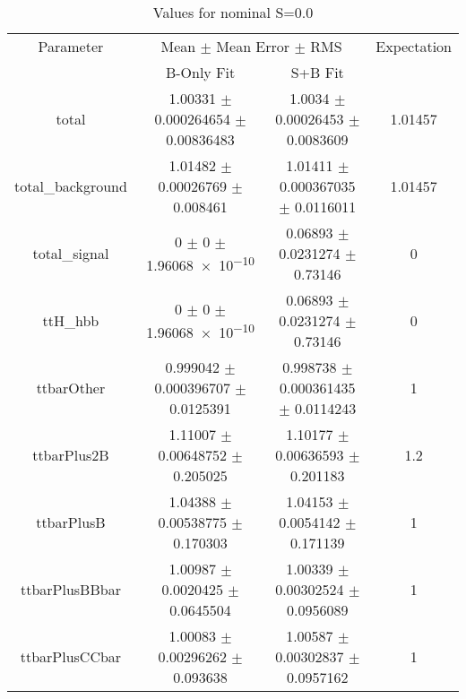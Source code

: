 \begin{table}
\centering
\caption{Values for nominal S=0.0}
\begin{tabular}{cccc}
\toprule
Parameter & \multicolumn{2}{c}{Mean $\pm$ Mean Error $\pm$ RMS} & Expectation\\
 & B-Only Fit & S+B Fit & \\
\midrule
total & \num{1.00331} $\pm$ \num{0.000264654} $\pm$ \num{0.00836483} & \num{1.0034} $\pm$ \num{0.00026453} $\pm$ \num{0.0083609} & \num{1.01457}\\
total\_background & \num{1.01482} $\pm$ \num{0.00026769} $\pm$ \num{0.008461} & \num{1.01411} $\pm$ \num{0.000367035} $\pm$ \num{0.0116011} & \num{1.01457}\\
total\_signal & \num{0} $\pm$ \num{0} $\pm$ \num{1.96068e-10} & \num{0.06893} $\pm$ \num{0.0231274} $\pm$ \num{0.73146} & \num{0}\\
ttH\_hbb & \num{0} $\pm$ \num{0} $\pm$ \num{1.96068e-10} & \num{0.06893} $\pm$ \num{0.0231274} $\pm$ \num{0.73146} & \num{0}\\
ttbarOther & \num{0.999042} $\pm$ \num{0.000396707} $\pm$ \num{0.0125391} & \num{0.998738} $\pm$ \num{0.000361435} $\pm$ \num{0.0114243} & \num{1}\\
ttbarPlus2B & \num{1.11007} $\pm$ \num{0.00648752} $\pm$ \num{0.205025} & \num{1.10177} $\pm$ \num{0.00636593} $\pm$ \num{0.201183} & \num{1.2}\\
ttbarPlusB & \num{1.04388} $\pm$ \num{0.00538775} $\pm$ \num{0.170303} & \num{1.04153} $\pm$ \num{0.0054142} $\pm$ \num{0.171139} & \num{1}\\
ttbarPlusBBbar & \num{1.00987} $\pm$ \num{0.0020425} $\pm$ \num{0.0645504} & \num{1.00339} $\pm$ \num{0.00302524} $\pm$ \num{0.0956089} & \num{1}\\
ttbarPlusCCbar & \num{1.00083} $\pm$ \num{0.00296262} $\pm$ \num{0.093638} & \num{1.00587} $\pm$ \num{0.00302837} $\pm$ \num{0.0957162} & \num{1}\\
\bottomrule
\end{tabular}
\end{table}